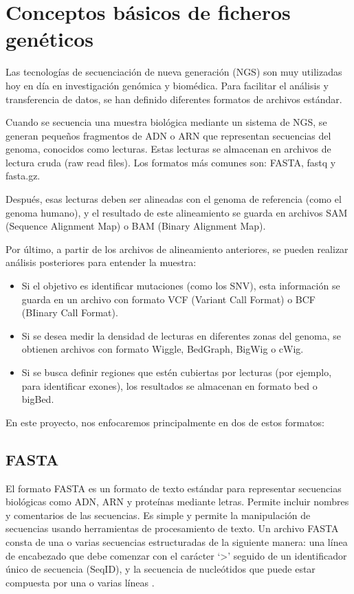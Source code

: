 \documentclass[11pt,spanish,listoffigures,listoftables]{tfgetsinf}
\begin{document}
\section{Conceptos básicos de ficheros genéticos}

Las tecnologías de secuenciación de nueva generación (NGS) son muy utilizadas hoy en día en investigación genómica y biomédica. Para facilitar el análisis y transferencia de datos, se han definido diferentes formatos de archivos estándar. 

Cuando se secuencia una muestra biológica mediante un sistema de NGS, se generan pequeños fragmentos de \ac{ADN} o \ac{ARN} que representan secuencias del genoma, conocidos como lecturas. Estas lecturas se almacenan en archivos de lectura cruda (raw read files). Los formatos más comunes son: \ac{FASTA}, fastq y fasta.gz. 

Después, esas lecturas deben ser alineadas con el genoma de referencia (como el genoma humano), y el resultado de este alineamiento se guarda en archivos SAM (Sequence Alignment Map) o BAM (Binary Alignment Map). 

Por último, a partir de los archivos de alineamiento anteriores, se pueden realizar análisis posteriores para entender la muestra:  

\begin{itemize}
   \item Si el objetivo es identificar mutaciones (como los SNV), esta información se guarda en un archivo con formato \ac{VCF} (Variant Call Format) o BCF (BIinary Call Format). 
   \item Si se desea medir la densidad de lecturas en diferentes zonas del genoma, se obtienen archivos con formato Wiggle, BedGraph, BigWig o cWig.
   \item Si se busca definir regiones que estén cubiertas por lecturas (por ejemplo, para identificar exones), los resultados se almacenan en formato bed o bigBed.
\end{itemize}

En este proyecto, nos enfocaremos principalmente en dos de estos formatos: 

\subsection{FASTA}

El formato \ac{FASTA} es un formato de texto estándar para representar secuencias biológicas como \ac{ADN}, \ac{ARN} y proteínas mediante letras. Permite incluir nombres y comentarios de las secuencias. Es simple y permite la manipulación de secuencias usando herramientas de procesamiento de texto\cite{JAV}. Un archivo \ac{FASTA} consta de una o varias secuencias estructuradas de la siguiente manera: una línea de encabezado que debe comenzar con el carácter ‘>’ seguido de un identificador único de secuencia (SeqID), y la secuencia de nucleótidos que puede estar compuesta por una o varias líneas \cite{FAS}.
\end{document}
